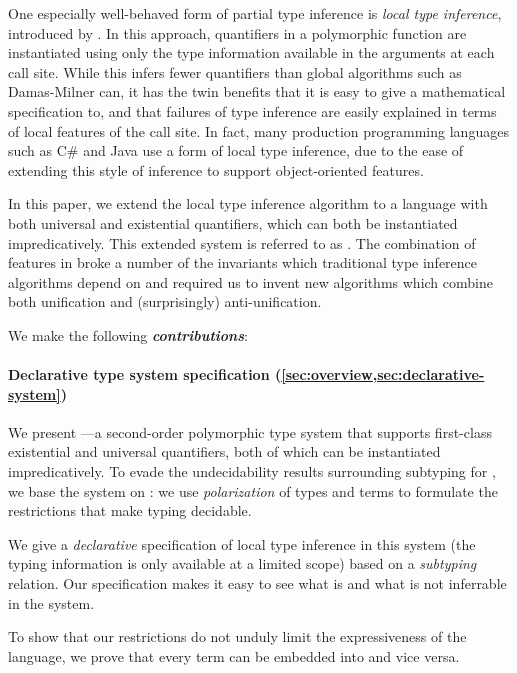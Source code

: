 One especially well-behaved form of partial type inference is 
\emph{local type inference}, introduced by \citet{pierce2000:local}. In this approach,
quantifiers in a polymorphic function are instantiated using only the type
information available in the arguments at each call site. While this infers
fewer quantifiers than global algorithms such as Damas-Milner can, it has the
twin benefits that it is easy to give a mathematical specification to, and that
failures of type inference are easily explained in terms of local features of
the call site. In fact, many production programming languages such as C\# and
Java use a form of local type inference, due to the ease of extending this style
of inference to support object-oriented features. 

In this paper, we extend the local type inference algorithm to a language with
both universal and existential quantifiers, which can both be instantiated
impredicatively. This extended system is referred to as \fexists. The
combination of features in \fexists  broke a number of the invariants which
traditional type inference algorithms depend on and required us to invent
new algorithms which combine both unification and (surprisingly)
anti-unification.

We make the following \emph{\textbf{contributions}}:

\paragraph*{Declarative type system specification (\cref{sec:overview,sec:declarative-system})} 
    We present \fexists---a second-order polymorphic type system that supports first-class
    existential and universal quantifiers, both of which can be instantiated
    impredicatively. To evade the undecidability results surrounding subtyping
    for \systemf, we base the system on \CBPV \cite{levy2006:cbpv}: we
    use \emph{polarization} of types and terms to formulate the restrictions
    that make typing decidable. 

    We give a \emph{declarative} specification of local type inference in this
    system (\ie the typing information is only available at a limited scope)
    based on a \emph{subtyping} relation. Our specification makes it easy to see
    what is and what is not inferrable in the system. 

    To show that our restrictions do not unduly limit the expressiveness of the
    language, we prove that every \fexists term can be embedded into \systemf
    and vice versa.

